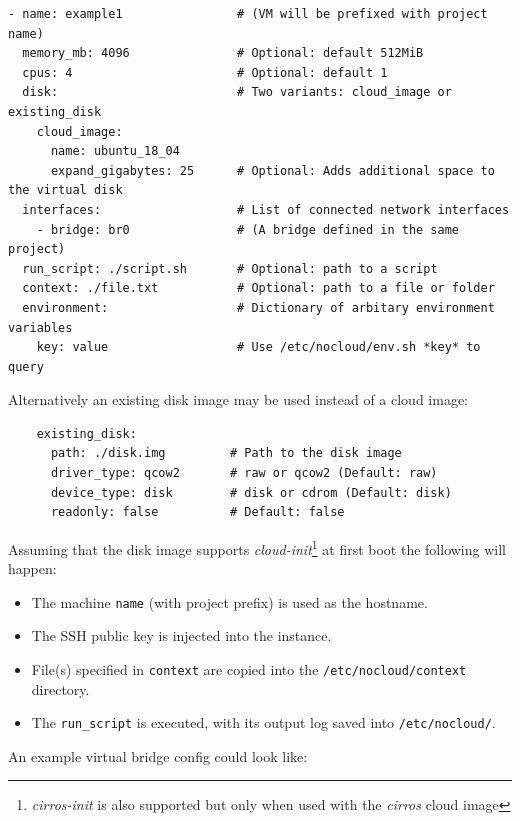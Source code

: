 \documentclass[
    author={Jacob Daniel Halsey},
    supervisor={Prof. Awais Rashid},
    degree={BSc},
    title={Building a Testbed for Evaluating Privacy Enhancing Technologies  (PETs)},
    subtitle={},
    type={software development},
    year={2021}
]{dissertation}
\begin{document}
\begin{verbatim}
- name: example1                # (VM will be prefixed with project name)
  memory_mb: 4096               # Optional: default 512MiB
  cpus: 4                       # Optional: default 1
  disk:                         # Two variants: cloud_image or existing_disk 
    cloud_image:
      name: ubuntu_18_04
      expand_gigabytes: 25      # Optional: Adds additional space to the virtual disk
  interfaces:                   # List of connected network interfaces
    - bridge: br0               # (A bridge defined in the same project)
  run_script: ./script.sh       # Optional: path to a script
  context: ./file.txt           # Optional: path to a file or folder
  environment:                  # Dictionary of arbitary environment variables
    key: value                  # Use /etc/nocloud/env.sh *key* to query
\end{verbatim}

Alternatively an existing disk image may be used instead of a cloud image:

\begin{verbatim}
    existing_disk:
      path: ./disk.img         # Path to the disk image
      driver_type: qcow2       # raw or qcow2 (Default: raw)
      device_type: disk        # disk or cdrom (Default: disk)
      readonly: false          # Default: false
\end{verbatim}


Assuming that the disk image supports \emph{cloud-init}\footnote{
	\emph{cirros-init} is also supported but only when used with the \emph{cirros} cloud image
} at first boot the following will happen:

\begin{singlespace}
	\begin{itemize}
		\item The machine \texttt{name} (with project prefix) is used as the hostname.
		\item The SSH public key is injected into the instance.
		\item File(s) specified in \texttt{context} are copied into the \texttt{/etc/nocloud/context} directory.
		\item The \texttt{run\_script} is executed, with its output log saved into \texttt{/etc/nocloud/}.
	\end{itemize}
\end{singlespace}

An example virtual bridge config could look like:
\end{document}
